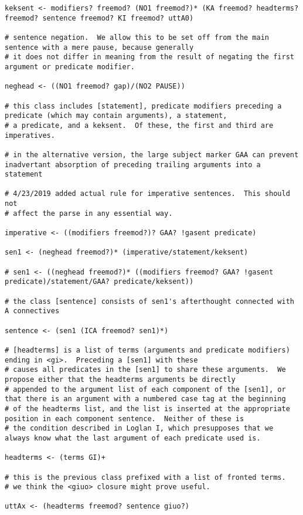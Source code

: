 \documentclass[12pt]{book}
\begin{document}
{\begin{verbatim}
keksent <- modifiers? freemod? (NO1 freemod?)* (KA freemod? headterms? freemod? sentence freemod? KI freemod? uttA0)

# sentence negation.  We allow this to be set off from the main sentence with a mere pause, because generally
# it does not differ in meaning from the result of negating the first argument or predicate modifier.

neghead <- ((NO1 freemod? gap)/(NO2 PAUSE))

# this class includes [statement], predicate modifiers preceding a predicate (which may contain arguments), a statement,
# a predicate, and a keksent.  Of these, the first and third are imperatives.

# in the alternative version, the large subject marker GAA can prevent inadvertant absorption of preceding trailing arguments into a statement

# 4/23/2019 added actual rule for imperative sentences.  This should not
# affect the parse in any essential way.

imperative <- ((modifiers freemod?)? GAA? !gasent predicate)

sen1 <- (neghead freemod?)* (imperative/statement/keksent)

# sen1 <- ((neghead freemod?)* ((modifiers freemod? GAA? !gasent predicate)/statement/GAA? predicate/keksent))

# the class [sentence] consists of sen1's afterthought connected with A connectives

sentence <- (sen1 (ICA freemod? sen1)*)

# [headterms] is a list of terms (arguments and predicate modifiers) ending in <gi>.  Preceding a [sen1] with these
# causes all predicates in the [sen1] to share these arguments.  We propose either that the headterms arguments be directly
# appended to the argument list of each component of the [sen1], or that there is an argument with a numbered case tag at the beginning
# of the headterms list, and the list is inserted at the appropriate position in each component sentence.  Neither of these is
# the condition described in Loglan I, which presupposes that we always know what the last argument of each predicate used is.

headterms <- (terms GI)+

# this is the previous class prefixed with a list of fronted terms.
# we think the <giuo> closure might prove useful.

uttAx <- (headterms freemod? sentence giuo?)


\end{verbatim}}
\end{document}
